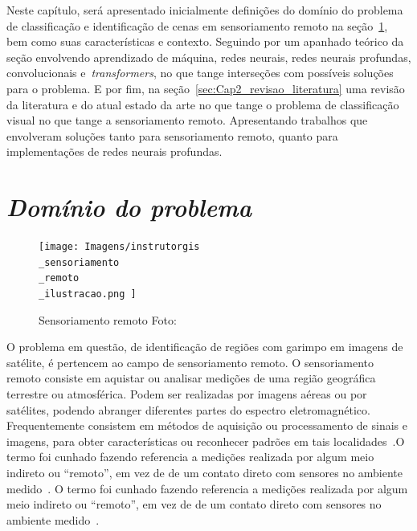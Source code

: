 Neste capítulo, será apresentado inicialmente definições do domínio do problema de classificação e identificação de cenas em sensoriamento remoto na seção~\ref{sec:Cap2_dominio}, bem como suas características e contexto. Seguindo por um apanhado teórico da seção envolvendo aprendizado de máquina, redes neurais, redes neurais profundas, convolucionais e~\textit{transformers}, no que tange interseções com possíveis soluções para o problema.
E por fim, na seção~\ref{sec:Cap2_revisao_literatura} uma revisão da literatura e do atual estado da arte no que tange o problema de classificação visual no que tange a sensoriamento remoto. Apresentando trabalhos que envolveram soluções tanto para sensoriamento remoto, quanto para implementações de redes neurais profundas.



\section{\textit{Domínio do problema}}\label{sec:Cap2_dominio}
\begin{figure}[!ht]
    \centering
    \texttt{[image: 
        Imagens/instrutorgis\\\_sensoriamento\\\_remoto\\\_ilustracao.png
    ]}
    \caption{Sensoriamento remoto Foto:}
   \label{fig:sensoriamento}
\end{figure}

O problema em questão, de identificação de regiões com garimpo em imagens de satélite, é pertencem ao campo de sensoriamento remoto. O sensoriamento remoto consiste em aquistar ou analisar medições de uma região geográfica terrestre ou atmosférica. Podem ser realizadas por imagens aéreas ou por satélites, podendo abranger diferentes partes do espectro eletromagnético.
Frequentemente consistem em métodos de aquisição ou processamento de sinais e imagens, para obter características ou reconhecer padrões em tais localidades~\cite{emery2017introduction}.O termo foi cunhado fazendo referencia a medições realizada por algum meio indireto ou “remoto”, em vez de de um contato direto com sensores no ambiente medido~\cite{emery2017introduction}. O termo foi cunhado fazendo referencia a medições realizada por algum meio indireto ou “remoto”, em vez de de um contato direto com sensores no ambiente medido~\cite{emery2017introduction}.


